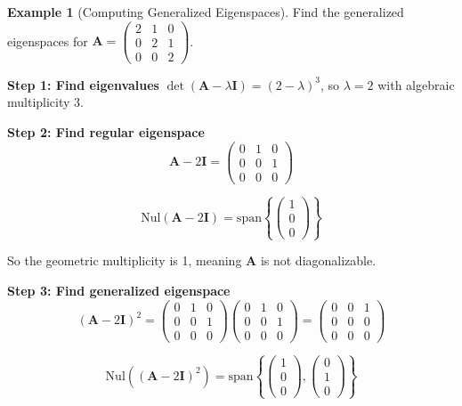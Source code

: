 \documentclass[12pt]{article}
\numberwithin{equation}{section}
\newcommand{\mat}[1]{\mathbf{#1}}        %
\theoremstyle{plain}
\theoremstyle{definition}
\newtheorem{example}[theorem]{Example}
\theoremstyle{remark}
\begin{document}
\begin{example}[Computing Generalized Eigenspaces]
Find the generalized eigenspaces for $\mat{A} = \begin{pmatrix} 2 & 1 & 0 \\ 0 & 2 & 1 \\ 0 & 0 & 2 \end{pmatrix}$.

\textbf{Step 1: Find eigenvalues}
$\det(\mat{A} - \lambda\mat{I}) = (2 - \lambda)^3$, so $\lambda = 2$ with algebraic multiplicity 3.

\textbf{Step 2: Find regular eigenspace}
$$\mat{A} - 2\mat{I} = \begin{pmatrix} 0 & 1 & 0 \\ 0 & 0 & 1 \\ 0 & 0 & 0 \end{pmatrix}$$

$$\text{Nul}(\mat{A} - 2\mat{I}) = \text{span}\left\{\begin{pmatrix} 1 \\ 0 \\ 0 \end{pmatrix}\right\}$$

So the geometric multiplicity is 1, meaning $\mat{A}$ is not diagonalizable.

\textbf{Step 3: Find generalized eigenspace}
$$(\mat{A} - 2\mat{I})^2 = \begin{pmatrix} 0 & 1 & 0 \\ 0 & 0 & 1 \\ 0 & 0 & 0 \end{pmatrix}\begin{pmatrix} 0 & 1 & 0 \\ 0 & 0 & 1 \\ 0 & 0 & 0 \end{pmatrix} = \begin{pmatrix} 0 & 0 & 1 \\ 0 & 0 & 0 \\ 0 & 0 & 0 \end{pmatrix}$$

$$\text{Nul}((\mat{A} - 2\mat{I})^2) = \text{span}\left\{\begin{pmatrix} 1 \\ 0 \\ 0 \end{pmatrix}, \begin{pmatrix} 0 \\ 1 \\ 0 \end{pmatrix}\right\}$$


\end{example}
\end{document}
